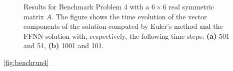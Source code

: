 \begin{figure}[H]
\centering
{}
\qquad
{}
\caption{Results for Benchmark Problem 4 with a $6\times 6$ real symmetric matrix $A$. The figure shows the time evolution of the vector components of the solution computed by Euler's method and the FFNN solution with, respectively, the following time steps: \textbf{(a)} 501 and 51, \textbf{(b)} 1001 and 101.}
\label{fig:benchrun4comp2}
\end{figure}


\autoref{fig:benchrun4}

